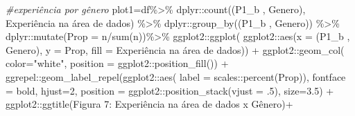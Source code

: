 \documentclass[
]{article}
\newenvironment{Shaded}{\begin{snugshade}}{\end{snugshade}}
\newcommand{\AttributeTok}[1]{\textcolor[rgb]{0.77,0.63,0.00}{#1}}
\newcommand{\CommentTok}[1]{\textcolor[rgb]{0.56,0.35,0.01}{\textit{#1}}}
\newcommand{\DecValTok}[1]{\textcolor[rgb]{0.00,0.00,0.81}{#1}}
\newcommand{\FloatTok}[1]{\textcolor[rgb]{0.00,0.00,0.81}{#1}}
\newcommand{\FunctionTok}[1]{\textcolor[rgb]{0.00,0.00,0.00}{#1}}
\newcommand{\NormalTok}[1]{#1}
\newcommand{\OtherTok}[1]{\textcolor[rgb]{0.56,0.35,0.01}{#1}}
\newcommand{\SpecialCharTok}[1]{\textcolor[rgb]{0.00,0.00,0.00}{#1}}
\newcommand{\StringTok}[1]{\textcolor[rgb]{0.31,0.60,0.02}{#1}}
\begin{document}
\begin{Shaded}
\begin{Highlighting}[]
\CommentTok{\#experiência por gênero}
\NormalTok{plot1}\OtherTok{=}\NormalTok{df}\SpecialCharTok{\%\textgreater{}\%}
\NormalTok{  dplyr}\SpecialCharTok{::}\FunctionTok{count}\NormalTok{(}\StringTok{\textasciigrave{}}\AttributeTok{(\textquotesingle{}P1\_b \textquotesingle{}, \textquotesingle{}Genero\textquotesingle{})}\StringTok{\textasciigrave{}}\NormalTok{, }\StringTok{\textasciigrave{}}\AttributeTok{Experiência na área de dados}\StringTok{\textasciigrave{}}\NormalTok{) }\SpecialCharTok{\%\textgreater{}\%}
\NormalTok{  dplyr}\SpecialCharTok{::}\FunctionTok{group\_by}\NormalTok{(}\StringTok{\textasciigrave{}}\AttributeTok{(\textquotesingle{}P1\_b \textquotesingle{}, \textquotesingle{}Genero\textquotesingle{})}\StringTok{\textasciigrave{}}\NormalTok{) }\SpecialCharTok{\%\textgreater{}\%}
\NormalTok{  dplyr}\SpecialCharTok{::}\FunctionTok{mutate}\NormalTok{(}\AttributeTok{Prop =}\NormalTok{ n}\SpecialCharTok{/}\FunctionTok{sum}\NormalTok{(n))}\SpecialCharTok{\%\textgreater{}\%}
\NormalTok{  ggplot2}\SpecialCharTok{::}\FunctionTok{ggplot}\NormalTok{(}
\NormalTok{    ggplot2}\SpecialCharTok{::}\FunctionTok{aes}\NormalTok{(}\AttributeTok{x =} \StringTok{\textasciigrave{}}\AttributeTok{(\textquotesingle{}P1\_b \textquotesingle{}, \textquotesingle{}Genero\textquotesingle{})}\StringTok{\textasciigrave{}}\NormalTok{, }\AttributeTok{y =}\NormalTok{ Prop,}
                 \AttributeTok{fill =} \StringTok{\textasciigrave{}}\AttributeTok{Experiência na área de dados}\StringTok{\textasciigrave{}}\NormalTok{)) }\SpecialCharTok{+}
\NormalTok{  ggplot2}\SpecialCharTok{::}\FunctionTok{geom\_col}\NormalTok{( }\AttributeTok{color=}\StringTok{"white"}\NormalTok{,}
                     \AttributeTok{position =}\NormalTok{ ggplot2}\SpecialCharTok{::}\FunctionTok{position\_fill}\NormalTok{()) }\SpecialCharTok{+}
\NormalTok{  ggrepel}\SpecialCharTok{::}\FunctionTok{geom\_label\_repel}\NormalTok{(ggplot2}\SpecialCharTok{::}\FunctionTok{aes}\NormalTok{(}
    \AttributeTok{label =}\NormalTok{ scales}\SpecialCharTok{::}\FunctionTok{percent}\NormalTok{(Prop)),}
    \AttributeTok{fontface =} \StringTok{\textquotesingle{}bold\textquotesingle{}}\NormalTok{,}
    \AttributeTok{hjust=}\DecValTok{2}\NormalTok{,}
    \AttributeTok{position =}\NormalTok{ ggplot2}\SpecialCharTok{::}\FunctionTok{position\_stack}\NormalTok{(}\AttributeTok{vjust =}\NormalTok{ .}\DecValTok{5}\NormalTok{),}
    \AttributeTok{size=}\FloatTok{3.5}\NormalTok{) }\SpecialCharTok{+}
\NormalTok{  ggplot2}\SpecialCharTok{::}\FunctionTok{ggtitle}\NormalTok{(}\StringTok{\textquotesingle{}Figura 7: Experiência na área de dados x Gênero\textquotesingle{}}\NormalTok{)}\SpecialCharTok{+}

\end{Highlighting}
\end{Shaded}
\end{document}
